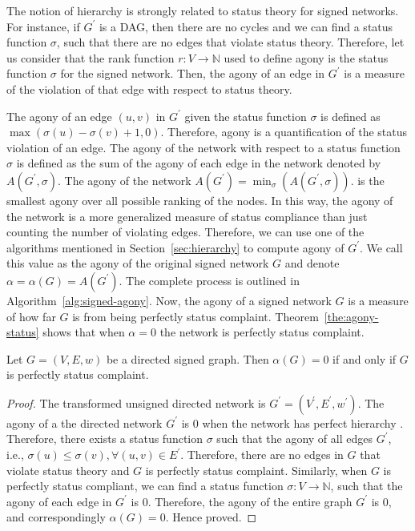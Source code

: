 The notion of hierarchy is strongly related to status theory for signed networks.
For instance, if $G^\prime$ is a DAG, then there are no cycles and we can find a status function $\sigma$, such that there are no edges that violate status theory.
Therefore, let us consider that the rank function $r:V\rightarrow \mathbb{N}$ used to define agony is the status function $\sigma$ for the signed network.
Then, the agony of an edge in $G^\prime$ is a measure of the violation of that edge with respect to status theory.

The agony of an edge $(u,v)$ in $G^\prime$ given the status function $\sigma$ is defined as $\max(\sigma(u)-\sigma(v)+1,0)$.
Therefore, agony is a quantification of the status violation of an edge.
The agony of the network with respect to a status function $\sigma$ is defined as the sum of the agony of each edge in the network denoted by $A(G^\prime,\sigma)$.
The agony of the network $A(G^\prime)= \min_\sigma(A(G^\prime,\sigma))$. is the smallest agony over all possible ranking of the nodes.
In this way, the agony of the network is a more generalized measure of status compliance than just counting the number of violating edges.
Therefore, we can use one of the algorithms mentioned in Section~\ref{sec:hierarchy} to compute agony of $G^\prime$.
We call this value as the agony of the original signed network $G$ and denote $\alpha = \alpha(G) = A(G^\prime)$.
The complete process is outlined in Algorithm~\ref{alg:signed-agony}.
Now, the agony of a signed network $G$ is a measure of how far $G$ is from being perfectly status complaint.
Theorem~\ref{the:agony-status} shows that when $\alpha=0$ the network is perfectly status complaint. 

\begin{theorem}
\label{the:agony-status}
Let $G=(V,E,w)$ be a directed signed graph.
Then $\alpha(G)=0$ if and only if $G$ is perfectly status complaint.
\end{theorem}
\begin{proof}
    The transformed unsigned directed network is $G^\prime=(V^\prime,E^\prime,w^\prime)$. The agony of a the directed network $G^\prime$ is 0 when the network has perfect hierarchy \cite{gupte2011finding}. Therefore, there exists a status function $\sigma$ such that the agony of all edges $G^\prime$, i.e., $\sigma(u) \leq \sigma(v), \forall (u,v)\in E^\prime$. Therefore, there are no edges in $G$ that violate status theory and $G$ is perfectly status complaint.
    Similarly, when $G$ is perfectly status compliant, we can find a status function $\sigma:V\rightarrow \mathbb{N}$, such that the agony of each edge in $G^\prime$ is $0$.
    Therefore, the agony of the entire graph $G^\prime$ is $0$, and correspondingly $\alpha(G)=0$.
    Hence proved.
\end{proof}

